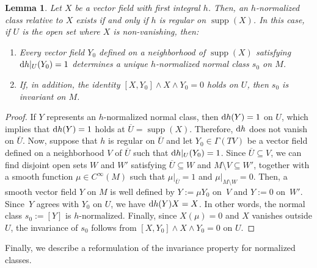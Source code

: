 \documentclass[pdftex]{sigma}%
\newcommand{\dd}{{\rm d}}
\numberwithin{equation}{section}
\newtheorem{Lemma}[Theorem]{Lemma}
\begin{document}
\begin{Lemma}\label{lemma:NormalGood}
Let $X$ be a vector field with first integral $h$. Then, an $h$-normalized class relative to $X$ exists if and only if $h$ is regular on $\operatorname{supp}(X)$. In this case, if $U$ is the open set where $X$ is non-vanishing, then:
 \begin{enumerate}\itemsep=0pt
 \item[$1.$] Every vector field $Y_0$ defined on a neighborhood of $\operatorname{supp}(X)$ satisfying $\dd h|_{U}(Y_0) = 1$ determines a unique $h$-normalized normal class $s_{0}$ on $M$.
 \item[$2.$] If, in addition, the identity $[X,Y_0] \wedge X \wedge Y_0 = 0$ holds on $U$, then $s_{0}$ is invariant on $M$.
 \end{enumerate}
\end{Lemma}
\begin{proof}
If $Y$ represents an $h$-normalized normal class, then $\dd h(Y) = 1$ on $U$, which implies that $\dd h(Y) = 1$ holds at $\overline{U} = \operatorname{supp}(X)$. Therefore, $\dd h$ does not vanish on $\overline{U}$. Now, suppose that $h$ is regular on $\overline{U}$ and let $Y_0 \in \Gamma(TV)$ be a vector field defined on a neighborhood $V$ of $\overline{U}$ such that $\dd h|_{U}(Y_0) = 1$. Since $\overline{U} \subseteq V$, we can find disjoint open sets $W$ and $W'$ satisfying $\overline{U} \subseteq W$ and $M \setminus V \subseteq W'$, together with a smooth function $\mu \in C^{\infty}(M)$ such that $\mu|_{\overline{U}} = 1$ and $\mu|_{M \setminus W} = 0$. Then, a smooth vector field $Y$ on $M$ is well defined by $Y := \mu Y_0$ on~$V$ and $Y := 0$ on~$W'$. Since~$Y$ agrees with $Y_0$ on $U$, we have $\dd h(Y)X = X$. In other words, the normal class $s_0:=[Y]$ is $h$-normalized.
Finally, since $X(\mu) = 0$ and $X$ vanishes outside $U$, the invariance of $s_0$ follows from $[X,Y_0] \wedge X \wedge Y_0 = 0$ on $U$.
\end{proof}

Finally, we describe a reformulation of the invariance property for normalized classes.
\end{document}

